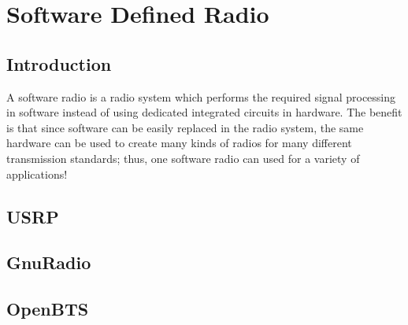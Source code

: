 \chapter{Software Defined Radio}


\section{Introduction}
A software radio is a radio system which performs the required signal processing in software instead of using dedicated integrated circuits in hardware. The benefit is that since software can be easily replaced in the radio system, the same hardware can be used to create many kinds of radios for many different transmission standards; thus, one software radio can used for a variety of applications!


\section{USRP}


\section{GnuRadio}

\section{OpenBTS}
